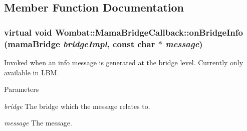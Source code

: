 \subsection{Member Function Documentation}
\hypertarget{classWombat_1_1MamaBridgeCallback_abeee9bb398dabab847fc5307940ad832}{
\subsubsection[{onBridgeInfo}]{\setlength{\rightskip}{0pt plus 5cm}virtual void Wombat::MamaBridgeCallback::onBridgeInfo (mamaBridge {\em bridgeImpl}, \/  const char $\ast$ {\em message})}}
\label{classWombat_1_1MamaBridgeCallback_abeee9bb398dabab847fc5307940ad832}


Invoked when an info message is generated at the bridge level. Currently only available in LBM.


\begin{DoxyParams}{Parameters}
\item[{\em bridge}]The bridge which the message relates to. \item[{\em message}]The message. \end{DoxyParams}
